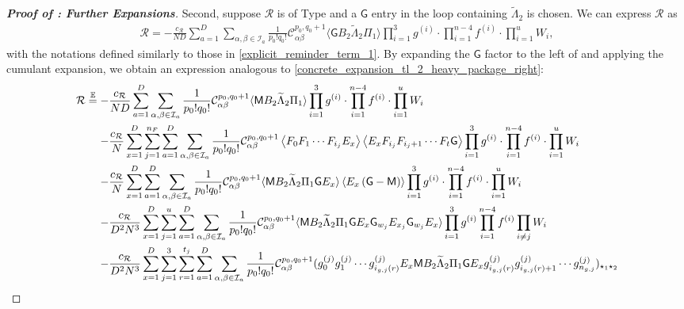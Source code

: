 \documentclass[10pt,reqno]{amsart}
\numberwithin{equation}{section}
\numberwithin{figure}{section}
\newcommand{\rmnum}[1]{\uppercase\expandafter{\romannumeral #1}}
\theoremstyle{plain} %
\theoremstyle{definition} %
\newcommand{\wt}{\widetilde}
\newcommand{\E}{\mathbb{E}}
\newcommand{\cI}{\mathcal{I}}
\newcommand{\cC}{\mathcal{C}}
\newcommand{\cR}{{\mathcal R}}
\newcommand{\cE}{{\mathcal{E}}}
\newcommand{\sG}{\mathsf G}
\newcommand{\sM}{\mathsf M}
\newcommand{\p}[1]{({#1})}
\newcommand{\pa}[1]{\left({#1}\right)}
\newcommand{\avg}[1]{\langle #1 \rangle}
\newcommand{\avga}[1]{\left\langle #1 \right\rangle}
\newcommand{\tLambda}{{\wt{\Lambda}}}
\newcommand{\bsum}[3]{\sum_{#1=1}^D\sum_{#2,#3\in \cI_{#1}}}
\newcommand{\iab}{\alpha\beta}
\newcommand{\tl}{\tLambda}
\newcommand{\eq}{\overset{\E}{=}}
\numberwithin{equation}{section}
\begin{document}
\begin{proof}[\bf Proof of : Further Expansions]
 Second, suppose $\cR$ is of Type \rmnum{2} and a $\sG$ entry in the loop containing $\tl_2$ is chosen. We can express $\cR$ as
    \begin{equation}\nonumber
        \begin{aligned}
            \cR=-\frac{c_{\cR}}{ND}\bsum{a}{\alpha}{\beta}\frac{1}{p_0!q_0!}\cC_{\iab}^{p_0,q_0+1}\avg{\sG B_2\tl_2\Pi_1}\prod_{i=1}^{3}g^{\pa{i}}\cdot \prod_{i=1}^{n-4}f^{\pa{i}}\cdot \prod_{i=1}^{u}W_i,
        \end{aligned}
    \end{equation}
with the notations defined similarly to those in \eqref{explicit_reminder_term_1}. By expanding the $\sG$ factor to the left of \smash{$\tl_2$} and applying the cumulant expansion, we obtain an expression analogous to \eqref{concrete_expansion_tl_2_heavy_package_right}: 
        \begin{align}
            \cR\eq -&\frac{c_{\cR}}{ND}\bsum{a}{\alpha}{\beta}\frac{1}{p_0!q_0!}\cC_{\iab}^{p_0,q_0+1}\avg{\sM B_2\tl_2\Pi_1}\prod_{i=1}^{3}g^{\pa{i}}\cdot\prod_{i=1}^{n-4}f^{\pa{i}}\cdot \prod_{i=1}^{u}W_i\notag\\
            -&   \frac{c_{\cR}}{N} \sum_{x=1}^D \sum_{j=1}^{n_{F}}\bsum{a}{\alpha}{\beta}\frac{1}{p_0!q_0!}\cC_{\iab}^{p_0,q_0+1}\left\langle F_0 F_1 \cdots F_{i_j} E_x\right\rangle\left\langle E_x F_{i_j} F_{i_j+1} \cdots F_t \sG\right\rangle\prod_{i=1}^{3}g^{\pa{i}}\cdot\prod_{i=1}^{n-4}f^{\pa{i}}\cdot\prod_{i=1}^{u}W_i\notag \\
            -& \frac{c_{\cR}}{N} \sum_{x=1}^D\bsum{a}{\alpha}{\beta}\frac{1}{p_0!q_0!}\cC_{\iab}^{p_0,q_0+1}\avg{\sM B_2 \tl_2 \Pi_1 \sG E_x}\avga{E_x\pa{\sG-\sM}}\prod_{i=1}^{3}g^{\pa{i}}\cdot\prod_{i=1}^{n-4}f^{\pa{i}}\cdot\prod_{i=1}^{u}W_i\notag \\
            -& \frac{c_{\cR}}{D^2 N^3} \sum_{x=1}^D \sum_{j=1}^u\bsum{a}{\alpha}{\beta}\frac{1}{p_0!q_0!}\cC_{\iab}^{p_0,q_0+1}\avg{\sM B_2\tl_2\Pi_1\sG E_x\sG_{w_j}E_{x_j}\sG_{w_j}E_x}\prod_{i=1}^{3}g^{\pa{i}}\prod_{i=1}^{n-4}f^{\pa{i}} \prod_{i \neq j} W_i\notag \\
            -& \frac{c_{\cR}}{D^2 N^3} \sum_{x=1}^D \sum_{j=1}^3 \sum_{r=1}^{t_j}\bsum{a}{\alpha}{\beta}\frac{1}{p_0!q_0!}\cC_{\iab}^{p_0,q_0+1}\p{g_{0}^{\pa{j}} g_{1}^{\pa{j}}\cdots g_{i_{g,j}\pa{r}}^{\pa{j}} E_x\sM B_2\tl_2 \Pi_1 \sG E_x g_{i_{g,j}\pa{r}}^{\pa{j}} g_{i_{g,j}\pa{r}+1}^{\pa{j}}\cdots g_{n_{g,j}}^{\pa{j}}}_{\star_1\star_2}\notag\\

\end{align}
\end{proof}
\end{document}
